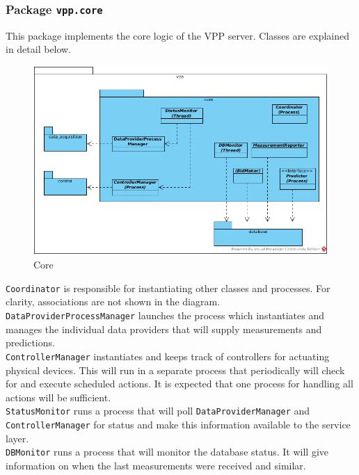 \subsubsection{Package \texttt{vpp.core}}
This package implements the core logic of the VPP server. Classes are explained in detail below.

\begin{figure}[H]
    \centering
    \includegraphics[width=\textwidth]{figures/class_core}
    \caption{Core}
    \label{figureClassDiagram}
\end{figure}

\texttt{Coordinator} is responsible for instantiating other classes and processes. For clarity, associations are not shown in the diagram.\\

\texttt{DataProviderProcessManager} launches the process which instantiates and manages the individual data providers that will supply measurements and predictions. \\

\texttt{ControllerManager} instantiates and keeps track of controllers for actuating physical devices. This will run in a separate process that periodically will check for and execute scheduled actions. It is expected that one process for handling all actions will be sufficient. \\

\texttt{StatusMonitor} runs a process that will poll \texttt{DataProviderManager} and \texttt{ControllerManager} for status and make this information available to the service layer.\\

\texttt{DBMonitor} runs a process that will monitor the database status. It will give information on when the last measurements were received and similar.\\


